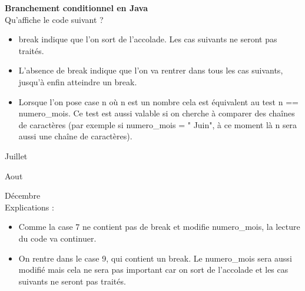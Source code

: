 \begin{Exercice}[5 minutes] \textbf{Branchement conditionnel en Java}\\
  Qu'affiche le code suivant ?   \\
  
  
   
    \begin{conseil}
      	\begin{itemize}
      		\item break indique que l'on sort de l'accolade. Les cas suivants ne seront pas traités.
      		\item L'absence de break indique que l'on va rentrer dans tous les cas suivants, jusqu'à enfin atteindre un break.
      		\item Lorsque l'on pose case n où n est un nombre cela est équivalent au test n == numero\_mois. Ce test est aussi valable si on cherche à comparer des chaînes de caractères (par exemple si numero\_mois = " Juin", à ce moment là n sera aussi une chaîne de caractères).
      	\end{itemize}
        
    \end{conseil}
    \begin{solution}
    
    Juillet
    
	Aout
	
	Décembre \\
	
	Explications : \\
	
	\begin{itemize}
      		\item Comme la case 7 ne contient pas de break et modifie numero\_mois, la lecture du code va continuer.
      		\item On rentre dans le case 9, qui contient un break. Le numero\_mois sera aussi modifié mais cela ne sera pas important car on sort de l'accolade et les cas suivants ne seront pas traités.
      \end{itemize}
           
    \end{solution}   
\end{Exercice}

